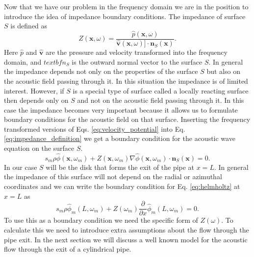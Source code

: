\documentclass[12pt, letter]{report}
\begin{document}
Now that we have our problem in the frequency domain we are in the position to introduce the idea of impedance boundary conditions. The impedance of surface $S$ is defined as 
\begin{equation}
\label{eq:impedance_definition}
Z(\textbf{x}, \omega) = \frac{\hat{p}(\textbf{x}, \omega)}{\hat{\textbf{v}}(\textbf{x}, \omega)] \cdot \textbf{n}_S(\textbf{x})}.
\end{equation}
Here $\hat{p}$ and $\hat{\textbf{v}}$ are the pressure and velocity transformed into the frequency domain, and $textbf{n}_S$ is the outward normal vector to the surface $S$. In general the impedance depends not only on the properties of the surface $S$ but also on the acoustic field passing through it. In this situation the impedance is of limited interest. However, if $S$ is a special type of surface called a locally reacting surface then depends only on $S$ and not on the acoustic field passing through it. In this case the impedance becomes very important because it allows us to formulate boundary conditions for the acoustic field on that surface. Inserting the frequency transformed versions of Eqs. \ref{eq:velocity_potential} into Eq. \ref{eq:impedance_definition} we get a boundary condition for the acoustic wave equation on the surface $S$.
\begin{equation}
s_m \rho \hat{\phi}(\textbf{x}, \omega_m) + Z(\textbf{x}, \omega_m) \nabla \hat{\phi}(\textbf{x}, \omega_m) \cdot \textbf{n}_S(\textbf{x}) = 0.
\end{equation}
In our case $S$ will be the disk that forms the exit of the pipe at $x=L$. In general the impedance of this surface will not depend on the radial or azimuthal coordinates and we can write the boundary condition for Eq. \ref{eq:helmholtz} at $x=L$ as 
\begin{equation}
\label{eq:boundary_two}
s_m \rho \hat{\phi}_m(L, \omega_m) + Z(\omega_m) \frac{\partial }{\partial x}\hat{\phi}_m(L, \omega_m)= 0.
\end{equation}
To use this as a boundary condition we need the specific form of $Z(\omega)$. To calculate this we need to introduce extra assumptions about the flow through the pipe exit. In the next section we will discuss a well known model for the acoustic flow through the exit of a cylindrical pipe.
\end{document}

